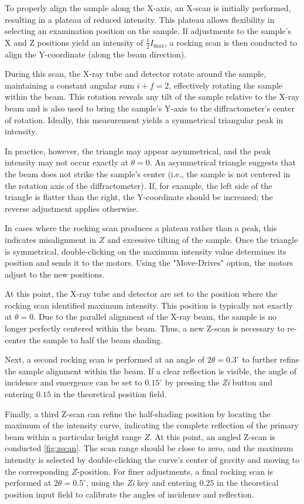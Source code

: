 To properly align the sample along the X-axis, an X-scan is initially performed, resulting in a plateau of reduced intensity. This plateau allows flexibility in selecting an examination position on the sample. If adjustments to the sample’s X and Z positions yield an intensity of \( \frac{1}{2} I_{\text{max}} \), a rocking scan is then conducted to align the Y-coordinate (along the beam direction). 

During this scan, the X-ray tube and detector rotate around the sample, maintaining a constant angular sum \( i + f = 2 \), effectively rotating the sample within the beam. This rotation reveals any tilt of the sample relative to the X-ray beam and is also used to bring the sample's Y-axis to the diffractometer's center of rotation. Ideally, this measurement yields a symmetrical triangular peak in intensity. 

In practice, however, the triangle may appear asymmetrical, and the peak intensity may not occur exactly at \( \theta = 0 \). An asymmetrical triangle suggests that the beam does not strike the sample’s center (i.e., the sample is not centered in the rotation axis of the diffractometer). If, for example, the left side of the triangle is flatter than the right, the Y-coordinate should be increased; the reverse adjustment applies otherwise.

In cases where the rocking scan produces a plateau rather than a peak, this indicates misalignment in \( Z \) and excessive tilting of the sample. Once the triangle is symmetrical, double-clicking on the maximum intensity value determines its position and sends it to the motors. Using the "Move-Drives" option, the motors adjust to the new positions.

At this point, the X-ray tube and detector are set to the position where the rocking scan identified maximum intensity. This position is typically not exactly at \( \theta = 0 \). Due to the parallel alignment of the X-ray beam, the sample is no longer perfectly centered within the beam. Thus, a new Z-scan is necessary to re-center the sample to half the beam shading.

Next, a second rocking scan is performed at an angle of \( 2\theta = 0.3^\circ \) to further refine the sample alignment within the beam. If a clear reflection is visible, the angle of incidence and emergence can be set to \( 0.15^\circ \) by pressing the \textit{Zi} button and entering \( 0.15 \) in the theoretical position field.

Finally, a third Z-scan can refine the half-shading position by locating the maximum of the intensity curve, indicating the complete reflection of the primary beam within a particular height range \( Z \). At this point, an angled Z-scan is conducted \autoref{fig:zscan}. The scan range should be close to zero, and the maximum intensity is selected by double-clicking the curve’s center of gravity and moving to the corresponding \( Z \)-position. For finer adjustments, a final rocking scan is performed at \( 2\theta = 0.5^\circ \), using the \textit{Zi} key and entering \( 0.25 \) in the theoretical position input field to calibrate the angles of incidence and reflection.


